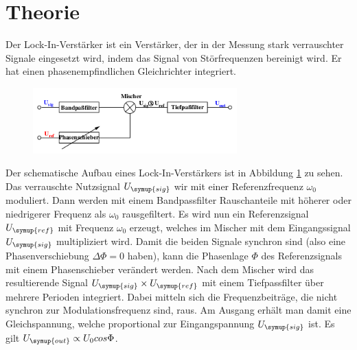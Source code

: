 \section{Theorie}
\label{sec:Theorie}
  Der Lock-In-Verstärker ist ein Verstärker, der in der Messung stark verrauschter
  Signale eingesetzt wird, indem das Signal von Störfrequenzen bereinigt wird.
  Er hat einen phasenempfindlichen Gleichrichter integriert.
  \begin{figure}
    \centering
    \includegraphics[width=0.7\textwidth]{aufbau.png}
    \label{fig:aufbau}
  \end{figure}
  Der schematische Aufbau eines Lock-In-Verstärkers ist in Abbildung \ref{fig:aufbau}
  zu sehen.
  Das verrauschte Nutzsignal $U_\symup{sig}$ wir mit einer Referenzfrequenz $\omega_0$
  moduliert. Dann werden mit einem Bandpassfilter Rauschanteile mit höherer oder
  niedrigerer Frequenz als $\omega_0$ rausgefiltert.
  Es wird nun ein Referenzsignal $U_\symup{ref}$ mit Frequenz $\omega_0$ erzeugt,
  welches im Mischer mit dem Eingangssignal $U_\symup{sig}$ multipliziert wird.
  Damit die beiden Signale synchron sind (also eine Phasenverschiebung
  $\Delta\Phi=0$ haben), kann die Phasenlage $\Phi$ des Referenzsignals mit einem
  Phasenschieber verändert werden.
  Nach dem Mischer wird das resultierende Signal $U_\symup{sig} \times U_\symup{ref}$
  mit einem Tiefpassfilter über mehrere Perioden integriert. Dabei mitteln sich
  die Frequenzbeiträge, die nicht synchron zur Modulationsfrequenz sind, raus.
  Am Ausgang erhält man damit eine Gleichspannung, welche proportional zur
  Eingangspannung $U_\symup{sig}$ ist. Es gilt $U_\symup{out}\propto U_0 cos\Phi$.
\cite{sample}
